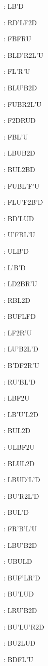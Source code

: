 \documentclass[9pt]{article}
\begin{document}
{\begin{multicols}{6}
: LB'D

: RD'LF2D

: FBFRU

: BLD'R2L'U

: FL'R'U

: BLU'B2D

: FUBR2L'U

: F2DRUD

: FBL'U

: LBUB2D

: BUL2BD

: FUBL'F'U

: FLU'F2B'D

: BD'LUD

: U'FBL'U

: ULB'D

: L'B'D

: LD2BR'U

: RBL2D

: BUFLFD

: LF2R'U

: LU'B2L'D

: B'DF2R'U

: RU'BL'D

: LBF2U

: LB'U'L2D

: BUL2D

: ULBF2U

: BLUL2D

: LBUD'L'D

: BU'R2L'D

: BUL'D

: FR'B'L'U

: LBU'B2D

: UBULD

: BUF'LR'D

: BU'LUD

: LRU'B2D

: BU'LU'R2D

: BU2LUD

: BDFL'U


\end{multicols}}
\end{document}
